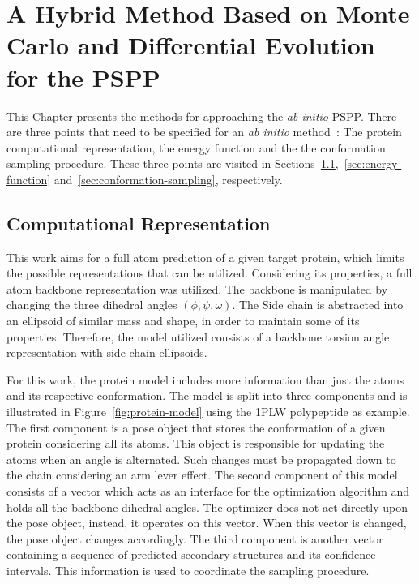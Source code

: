\chapter{A Hybrid Method Based on Monte Carlo and 
Differential Evolution for the \ac{PSPP}}\label{chap:methodology}

This Chapter presents the methods for approaching the \textit{ab initio} \ac{PSPP}. There are three points that need to be specified for an \textit{ab initio} method~\cite{dorn2014three}: The protein computational representation, the
energy function and the the conformation sampling procedure. These three points are
visited in Sections~\ref{sec:computation-representation},~\ref{sec:energy-function}
and~\ref{sec:conformation-sampling}, respectively.

\section{Computational Representation}
\label{sec:computation-representation}

This work aims for a full atom prediction of a given target protein, which limits the possible representations that can be utilized. 
Considering its properties, a full atom backbone representation was utilized.
The backbone is manipulated by changing the three dihedral angles $(\phi, \psi, \omega)$.
The Side chain is abstracted into an ellipsoid of similar mass and shape, in order
to maintain some of its properties. Therefore, the model utilized consists of
a backbone torsion angle representation with side chain ellipsoids.

For this work, the protein model includes more information
than just the atoms and its respective conformation. The model is split into three
components and is illustrated in Figure~\ref{fig:protein-model} using the 1PLW polypeptide as example. The first component is a pose object that stores the conformation of a given protein considering all its atoms. This object is responsible for updating
the atoms when an angle is alternated. Such changes must be propagated down to the chain
considering an arm lever effect. The second component of this model consists of a vector which
acts as an interface for the optimization algorithm and holds all the backbone dihedral
angles. The optimizer does not act directly
upon the pose object, instead, it operates on this vector. When this vector is changed, the pose object changes accordingly. The third
component is another vector containing a sequence of predicted secondary structures and its confidence
intervals. This information is used to coordinate the sampling procedure.

